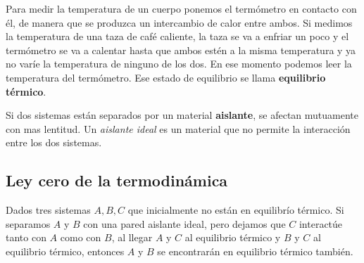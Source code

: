 \documentclass[12pt]{article}
\begin{document}
  Para medir la temperatura de un cuerpo ponemos el termómetro en contacto con él, de manera que se produzca un intercambio de calor entre ambos. Si medimos la temperatura de una taza de café caliente, la taza se va a enfriar un poco y el termómetro se va a calentar hasta que ambos estén a la misma temperatura y ya no varíe la temperatura de ninguno de los dos. En ese momento podemos leer la temperatura del termómetro. Ese estado de equilibrio se llama \textbf{equilibrio térmico}.

  Si dos sistemas están separados por un material \textbf{aislante}, se afectan mutuamente con mas lentitud. Un \textit{aislante ideal} es un material que no permite la interacción entre los dos sistemas.

  \subsection{Ley cero de la termodinámica}
  Dados tres sistemas $ A,B,C $ que inicialmente no están en equilibrío térmico. Si separamos $ A $ y $ B $ con una pared aislante ideal, pero dejamos que $ C $ interactúe tanto con $ A $ como con $ B $, al llegar $ A $ y $ C $ al equilibrio térmico y $ B $ y $ C $ al equilibrio térmico, entonces $ A $ y $ B $ se encontrarán en equilibrio térmico también.
\end{document}

